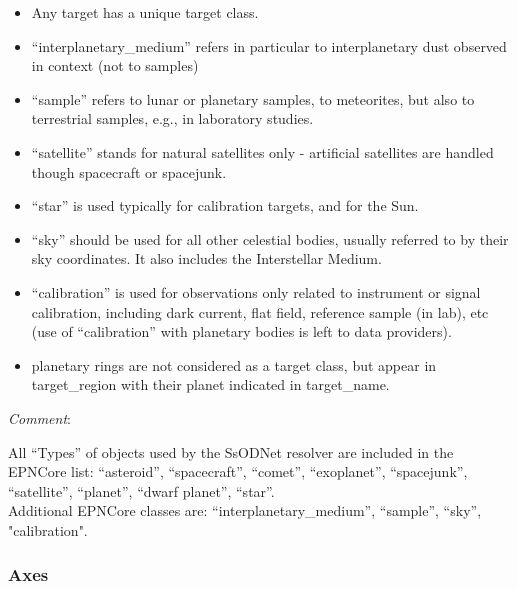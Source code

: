 \documentclass[11pt,a4paper]{ivoa}
\begin{document}
\begin{itemize}

\item Any target has a unique target class.

\item ``interplanetary\_medium'' refers in particular to interplanetary dust observed in context (not to samples)

\item ``sample'' refers to lunar or planetary samples, to meteorites, but also to terrestrial samples, e.g., in laboratory studies.

\item ``satellite'' stands for natural satellites only - artificial satellites are handled though spacecraft or spacejunk.

\item ``star'' is used typically for calibration targets, and for the Sun.

\item ``sky'' should be used for all other celestial bodies, usually referred to by their sky coordinates. It also includes the Interstellar Medium.

\item ``calibration'' is used for observations only related to instrument or signal calibration, including dark current, flat field, reference sample (in lab), etc (use of ``calibration'' with planetary bodies is left to data providers).

\item planetary rings are not considered as a target class, but appear in target\_region with their planet indicated in target\_name.

\end{itemize}

\emph{Comment}: 

All ``Types'' of objects used by the SsODNet resolver are included in the EPNCore list: ``asteroid'', ``spacecraft'', ``comet'', ``exoplanet'', ``spacejunk'', ``satellite'', ``planet'', ``dwarf planet'', ``star''.\\Additional EPNCore classes are: ``interplanetary\_medium'', ``sample'', ``sky'', "calibration".\\

\subsubsection{Axes \\}
\end{document}
